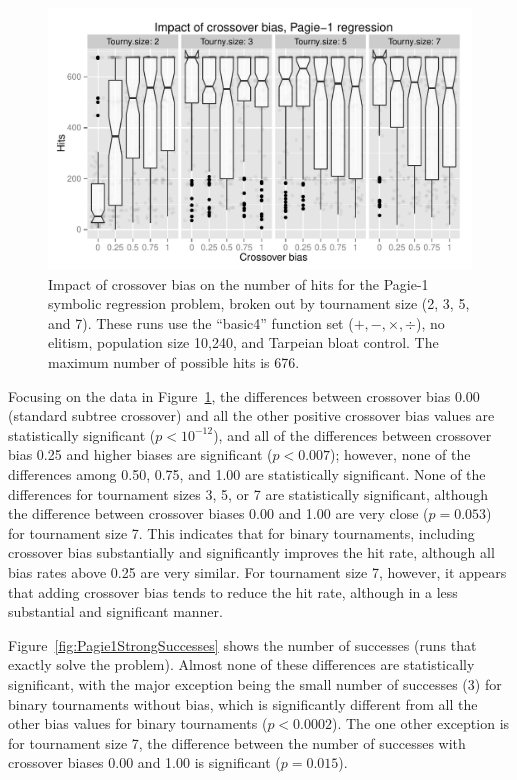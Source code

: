 \documentclass{sig-alternate}
\begin{document}
\begin{figure}
\centering
\includegraphics[width=0.45 \textwidth]{Plots/Pagie_1_strong_Hits_vs_Bias_Tournys_FunctionSet.pdf}
\caption{Impact of crossover bias on the number of hits for the Pagie-1 symbolic regression problem, broken out by 
tournament size (2, 3, 5, and 7). These runs use the ``basic4'' function set ($+, -, \times, \div$), no elitism, 
population size 10,240, and Tarpeian bloat control. The maximum number of possible hits is 676.}
\label{fig:Pagie1StrongHits_Bias_Tournys_FunctionSet}
\end{figure}

Focusing on the data in Figure~\ref{fig:Pagie1StrongHits_Bias_Tournys_FunctionSet}, the differences between crossover
bias 0.00 (standard subtree crossover) and all the other positive crossover bias values are statistically significant
($p<10^{-12}$), and all of the differences between crossover bias 0.25 and higher biases are significant ($p<0.007$);
however, none of the differences among 0.50, 0.75, and 1.00 are statistically significant. None of the differences for
tournament sizes 3, 5, or 7 are statistically significant, although the difference between crossover biases 0.00 and
1.00 are very close ($p=0.053$) for tournament size 7. This indicates that for binary tournaments, including crossover
bias substantially and significantly improves the hit rate, although all bias rates above 0.25 are very similar. For
tournament size 7, however, it appears that adding crossover bias tends to reduce the hit rate, although in a less
substantial and significant manner.

%
%
%
%

Figure~\ref{fig:Pagie1StrongSuccesses} shows the number of successes (runs that exactly solve the problem). Almost none
of these differences are statistically significant, with the major exception being the small number of successes (3)
for binary tournaments without bias, which is significantly different from all the other bias values for binary
tournaments ($p<0.0002$). The one other exception is for tournament size 7, the difference between the number of
successes with crossover biases 0.00 and 1.00 is significant ($p=0.015$).
\end{document}
